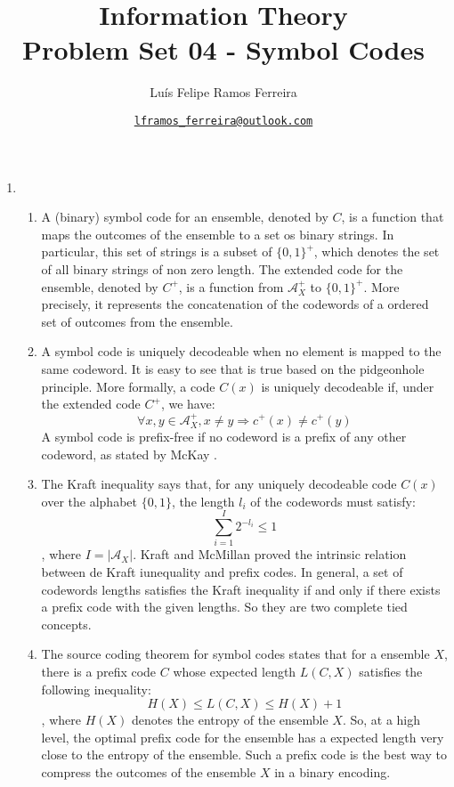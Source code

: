\documentclass{article}
\title{Information Theory \\ \large Problem Set 04 - Symbol Codes}
\author{Luís Felipe Ramos Ferreira}
\date{\href{mailto:lframos\_ferreira@outlook.com}{\texttt{lframos\_ferreira@outlook.com}}
}
\begin{document}
\maketitle

\begin{enumerate}
	\item \begin{enumerate}
		      \item A (binary) symbol code for an ensemble, denoted by \(C\), is a function that maps the outcomes of the ensemble to a set os binary strings. In particular, this set of strings is a subset of \(\{0, 1\}^+\), which denotes the set of all binary strings of non zero length. The extended code for the ensemble, denoted by \(C^+\), is a function from \(\mathcal{A}_X^+\) to \(\{0, 1\}^+\). More precisely, it represents the concatenation of the codewords of a ordered set of outcomes from the ensemble.
		      \item A symbol code is uniquely decodeable when no element is mapped to the same codeword. It is easy to see that is true based on the pidgeonhole principle. More formally, a code \(C(x)\) is uniquely decodeable if, under the extended code \(C^+\), we have:
		            \[\forall x, y \in \mathcal{A}_X^+, x \neq y \Rightarrow c^+(x) \neq c^+(y)\]
		            A symbol code is prefix-free if no codeword is a prefix of any other codeword, as stated by McKay \cite{MacKay}.
		      \item The Kraft inequality says that, for any uniquely decodeable code \(C(x)\) over the alphabet \(\{0,1\}\), the length \(l_i\) of the codewords must satisfy:
		            \[\sum_{i=1}^{I}2^{-l_i} \leq 1\],
		            where \(I = |\mathcal{A}_X|\).
		            Kraft and McMillan proved the intrinsic relation between de Kraft iunequality and prefix codes. In general, a set of codewords lengths satisfies the Kraft inequality if and only if there exists a prefix code with the given lengths. So they are two complete tied concepts.
		      \item The source coding theorem for symbol codes states that for a ensemble \(X\), there is a prefix code \(C\) whose expected length \(L(C, X)\) satisfies the following inequality:
		            \[H(X) \leq L(C, X) \leq H(X) + 1\],
		            where \(H(X)\) denotes the entropy of the ensemble \(X\).
		            So, at a high level, the optimal prefix code for the ensemble has a expected length very close to the entropy of the ensemble. Such a prefix code is the best way to compress the outcomes of the ensemble \(X\) in a binary encoding.
	      \end{enumerate}


\end{enumerate}
\end{document}
